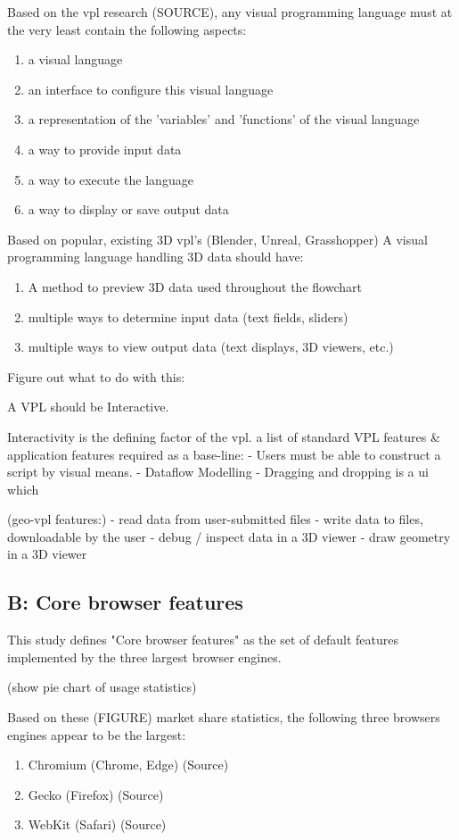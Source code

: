 Based on the vpl research (SOURCE), any visual programming language must at the very least contain the following aspects: 
\begin{enumerate}[-]
  \item a visual language
  \item an interface to configure this visual language 
  \item a representation of the 'variables' and 'functions' of the visual language
  \item a way to provide input data 
  \item a way to execute the language
  \item a way to display or save output data
\end{enumerate}

Based on popular, existing 3D vpl's (Blender, Unreal, Grasshopper) A visual programming language handling 3D data should have:
\begin{enumerate}[-]
  \item A method to preview 3D data used throughout the flowchart
  \item multiple ways to determine input data (text fields, sliders) 
  \item multiple ways to view output data (text displays, 3D viewers, etc.)
\end{enumerate}

\begin{note}
  Figure out what to do with this: 
 
  A VPL should be Interactive.

    Interactivity is the defining factor of the vpl. 
    a list of standard VPL features & application features required as a base-line:  
  - Users must be able to construct a script by visual means.
  - Dataflow Modelling
  - Dragging and dropping is a ui which

  (geo-vpl features:)
  - read data from user-submitted files
  - write data to files, downloadable by the user  
  - debug / inspect data in a 3D viewer
  - draw geometry in a 3D viewer

\end{note}

\subsection*{B: Core browser features}
This study defines "Core browser features" as the set of default features implemented by the three largest browser engines. 
\begin{note}
  (show pie chart of usage statistics)
\end{note}
Based on these (FIGURE) market share statistics, the following three browsers engines appear to be the largest:
\begin{enumerate}[-]
  \item Chromium (Chrome, Edge) (Source)
  \item Gecko (Firefox) (Source)
  \item WebKit (Safari) (Source)
\end{enumerate}

